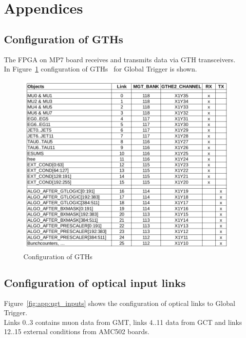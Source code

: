 \section{Appendices}\label{sec:app:app}

\subsection{Configuration of GTHs}\label{sec:app:app_a}

The FPGA on MP7 board receives and transmits data via GTH transceivers.\\
In Figure~\ref{fig:app:gth_conf} configuration of GTHs~\cite{GTHs} for Global Trigger is shown.

\begin{figure}[htb]
\centering
\includegraphics[width=15cm]{figures/gth_xc7v690t_ffg1927}
\caption{Configuration of GTHs}
\label{fig:app:gth_conf}
\end{figure}

\clearpage

\subsection{Configuration of optical input links}\label{sec:app:app_b}

Figure~\ref{fig:app:ugt_inputs} shows the configuration of optical links to Global Trigger.\\
Links 0..3 contains muon data from GMT, links 4..11 data from GCT and links 12..15 external conditions
from AMC502 boards.

